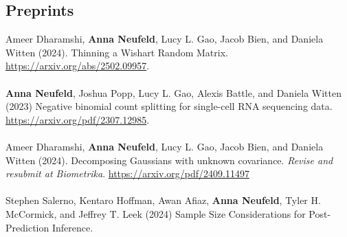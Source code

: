 \documentclass[margin, 10pt]{res}
\begin{document}
\begin{resume}
\section{Preprints} 
Ameer Dharamshi, \textbf{Anna Neufeld}, Lucy L. Gao, Jacob Bien, and Daniela Witten (2024). Thinning a Wishart Random Matrix. \href{https://arxiv.org/abs/2502.09957}{https://arxiv.org/abs/2502.09957}. \\
\\
\textbf{Anna Neufeld}, Joshua Popp, Lucy L. Gao, Alexis Battle, and Daniela Witten (2023) Negative binomial count splitting for single-cell RNA sequencing data. \\ \href{https://arxiv.org/pdf/2307.12985}{https://arxiv.org/pdf/2307.12985}. \\
\\
Ameer Dharamshi, \textbf{Anna Neufeld}, Lucy L. Gao, Jacob Bien, and Daniela Witten (2024). Decomposing Gaussians with unknown covariance. \emph{Revise and resubmit at Biometrika}. \href{https://arxiv.org/pdf/2409.11497}{https://arxiv.org/pdf/2409.11497} \\
\\
Stephen Salerno, Kentaro Hoffman,  Awan Afiaz, \textbf{Anna Neufeld}, Tyler H. McCormick, and Jeffrey T. Leek (2024) Sample Size Considerations for Post-Prediction Inference. %

\end{resume}
\end{document}
